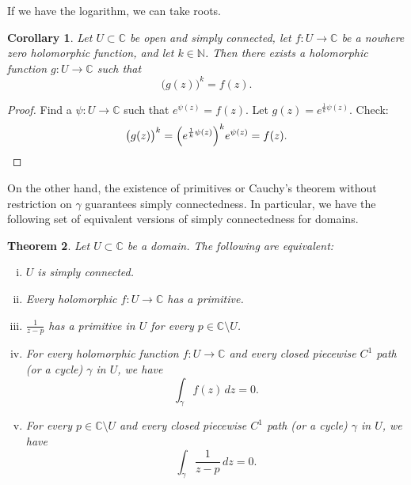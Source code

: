 \documentclass[12pt,openany]{book}
\newcommand{\C}{{\mathbb{C}}}
\newcommand{\N}{{\mathbb{N}}}
\theoremstyle{plain}
\newtheorem{thm}{Theorem}[section]
\newtheorem{cor}[thm]{Corollary}
\theoremstyle{remark}
\theoremstyle{definition}
\theoremstyle{exercise}
\theoremstyle{example}
\begin{document}
If we have the logarithm, we can take roots.

\begin{cor}
Let $U \subset \C$ be open and simply connected,
let $f \colon U \to \C$ be a nowhere zero holomorphic
function, and let $k \in \N$.
Then there exists a holomorphic function $g \colon U \to \C$
such that
\begin{equation*}
{\bigl(g(z)\bigr)}^k = f(z) .
\end{equation*}
\end{cor}

\begin{proof}
Find a $\psi \colon U \to \C$ such that $e^{\psi(z)} = f(z)$.  Let
$g(z) = e^{\frac{1}{k} \psi(z)}$.  Check:
\begin{equation*}
{\bigl(g(z)\bigr)}^k
=
{\left( e^{\frac{1}{k} \psi(z)} \right)}^k
e^{\psi(z)} = f(z) . \qedhere
\end{equation*}
\end{proof}

On the other hand, the existence of primitives or
Cauchy's theorem without restriction on $\gamma$ guarantees simply
connectedness.  In particular, we have the following set of equivalent
versions of simply connectedness for domains.

\begin{thm}
Let $U \subset \C$ be a domain.  The following are equivalent:
\begin{enumerate}[(i)]
\item \label{thm:simplyconnected:i}
$U$ is simply connected.
\item \label{thm:simplyconnected:ii}
Every holomorphic $f \colon U \to \C$ has a primitive.
\item \label{thm:simplyconnected:iii}
$\frac{1}{z-p}$ has a primitive in $U$ for every $p \in \C \setminus U$.
\item \label{thm:simplyconnected:iv}
For every holomorphic function $f \colon U \to \C$ and every
closed
piecewise $C^1$ path (or a cycle) $\gamma$ in $U$, we have
\begin{equation*}
\int_\gamma f(z) \, dz = 0 .
\end{equation*}
\item \label{thm:simplyconnected:v}
For every $p \in \C \setminus U$ and every
closed
piecewise $C^1$ path (or a cycle) $\gamma$ in $U$, we have
\begin{equation*}
\int_\gamma \frac{1}{z-p} \, dz = 0 .
\end{equation*}
\end{enumerate}
\end{thm}
\end{document}
